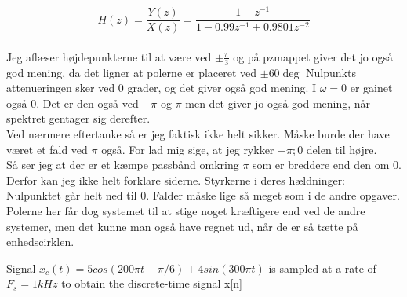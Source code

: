 \begin{Opgaver}
\begin{kapitel}
\begin{Opgave}
\begin{UnderOpgave}[\text{$y[n] = x[n] - x[n - 1] + 0.99y[n - 1] - 0.9801y[n - 2]$}]
                \[H(z) = \frac{Y(z)}{X(z)} = \frac{1 - z^{-1}}{1  - 0.99z^{-1} + 0.9801z^{-2}}\]
                \\
                Jeg aflæser højdepunkterne til at være ved $\pm \frac{\pi}{3}$ og på pzmappet giver det jo også god mening, da det ligner at polerne er placeret ved $\pm 60\deg$
                Nulpunkts attenueringen sker ved 0 grader, og det giver også god mening. I $\omega = 0$ er gainet også 0. Det er den også ved $-\pi$ og $\pi$ men det giver jo også god mening, når spektret gentager sig derefter. \\ 
                Ved nærmere eftertanke så er jeg faktisk ikke helt sikker. Måske burde der have været et fald ved $\pi$ også. For lad mig sige, at jeg rykker $-\pi; 0$ delen til højre.\\
                Så ser jeg at der er et kæmpe passbånd omkring $\pi$ som er breddere end den om 0. \\
                Derfor kan jeg ikke helt forklare siderne.
                Styrkerne i deres hældninger: \\
                Nulpunktet går helt ned til 0. Falder måske lige så meget som i de andre opgaver.\\
                Polerne her får dog systemet til at stige noget kræftigere end ved de andre systemer, men det kunne man også have regnet ud, når de er så tætte på enhedscirklen. 
                

            \end{UnderOpgave}

        \end{Opgave}

    \end{kapitel}
    \begin{kapitel}
        \begin{Opgave}
            Signal $x_c(t) = 5cos(200\pi t + \pi/6) + 4sin(300\pi t)$ is sampled at a rate of $F_s = 1kHz$ to obtain the discrete-time signal x[n]
            

\end{Opgave}
\end{kapitel}
\end{Opgaver}
